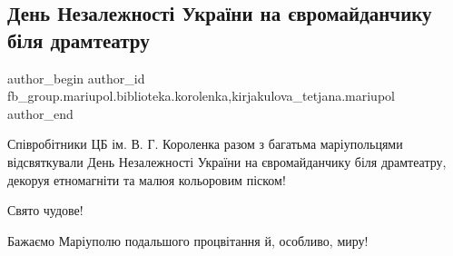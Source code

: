 
 
 
 
 

\subsection{День Незалежності України на євромайданчику біля драмтеатру}
\label{sec:24_08_2021.fb.fb_group.mariupol.biblioteka.korolenka.1.den_nezalezhnost__uk}
 
\ifcmt
 author_begin
   author_id fb_group.mariupol.biblioteka.korolenka,kirjakulova_tetjana.mariupol
 author_end
\fi

Співробітники ЦБ ім. В. Г. Короленка разом з багатьма маріупольцями
відсвяткували День Незалежності України на євромайданчику біля драмтеатру,
декоруя етномагніти та малюя кольоровим піском!

Свято чудове!

Бажаємо Маріуполю подальшого процвітання й, особливо, миру!
